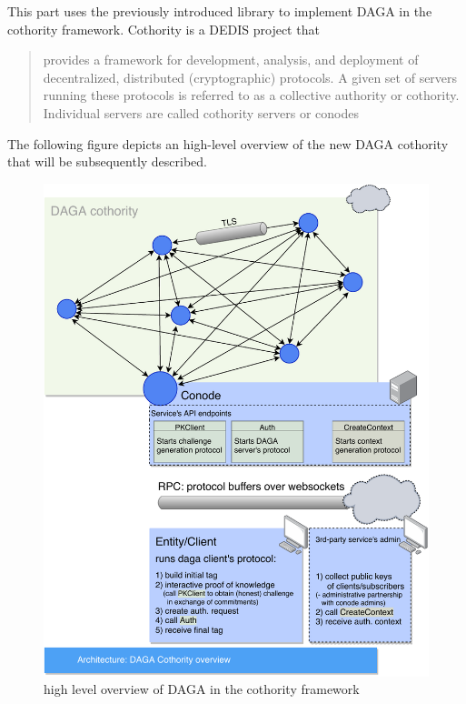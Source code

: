 
    This part uses the previously introduced library to implement DAGA in the cothority framework.
    \newline\noindent
    Cothority is a DEDIS project that \blockquote{
        provides a framework for development, analysis, and deployment of decentralized, distributed (cryptographic) protocols.
        A given set of servers running these protocols is referred to as a collective authority or cothority.
        Individual servers are called cothority servers or conodes\footnotemark[\thefootnote]
    }.%
    The following figure depicts an high-level overview of the new DAGA cothority that will be subsequently
    described.
    \begin{figure}%
        \includegraphics[scale=0.7]{images/dagacothority.pdf}
        \caption{high level overview of DAGA in the cothority framework}
        \label{fig:dagacothority}
    \end{figure}

